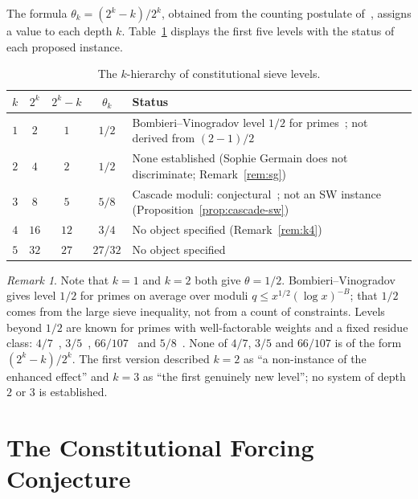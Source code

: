 \documentclass[12pt]{amsart}
\theoremstyle{plain}
\theoremstyle{definition}
\theoremstyle{remark}
\newtheorem{remark}[theorem]{Remark}
\begin{document}
The formula $\theta_k = (2^k - k)/2^k$, obtained from the counting postulate
of~\cite{WakilCF,WakilRamanujan}, assigns a value to each depth $k$.
Table~\ref{tab:hierarchy} displays the first five levels with the status of each
proposed instance.

\begin{table}[h]
\centering
\caption{The $k$-hierarchy of constitutional sieve levels.}
\label{tab:hierarchy}
\begin{tabular}{ccccp{7.2cm}}
\toprule
$k$ & $2^k$ & $2^k - k$ & $\theta_k$ & Status \\
\midrule
$1$ & $2$ & $1$ & $1/2$  & Bombieri--Vinogradov level $1/2$ for
  primes~\cite{Bombieri1965,Vinogradov1965}; not derived from $(2-1)/2$ \\
$2$ & $4$ & $2$ & $1/2$  & None established (Sophie Germain does not
  discriminate; Remark~\ref{rem:sg}) \\
$3$ & $8$ & $5$ & $5/8$  & Cascade moduli: conjectural~\cite{WakilEisenstein};
  not an SW instance (Proposition~\ref{prop:cascade-sw}) \\
$4$ & $16$& $12$& $3/4$  & No object specified (Remark~\ref{rem:k4}) \\
$5$ & $32$& $27$& $27/32$& No object specified \\
\bottomrule
\end{tabular}
\end{table}

\begin{remark}
Note that $k=1$ and $k=2$ both give $\theta = 1/2$. Bombieri--Vinogradov gives
level $1/2$ for primes on average over moduli $q \leq x^{1/2}(\log x)^{-B}$;
that $1/2$ comes from the large sieve inequality, not from a count of
constraints. Levels beyond $1/2$ are known for primes with well-factorable
weights and a fixed residue class: $4/7$~\cite{BFI1986}, $3/5$~\cite{Maynard2020},
$66/107$~\cite{Lichtman2023} and $5/8$~\cite{Pascadi2025}. None of $4/7$, $3/5$
and $66/107$ is of the form $(2^k - k)/2^k$. The first version described $k=2$
as ``a non-instance of the enhanced effect'' and $k=3$ as ``the first genuinely
new level''; no system of depth $2$ or $3$ is established.
\end{remark}

\section{The Constitutional Forcing Conjecture}
\end{document}
